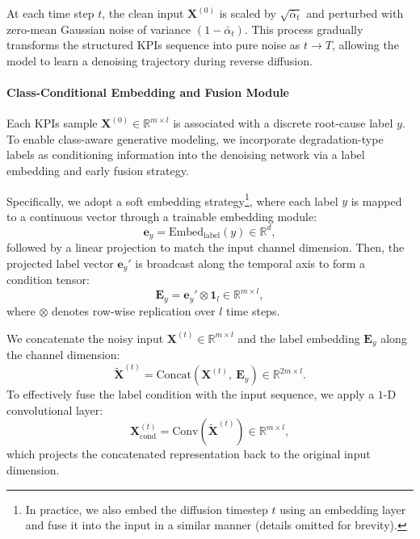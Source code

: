 \documentclass[lettersize,journal]{IEEEtran}
\begin{document}
At each time step $t$, the clean input $\mathbf{X}^{(0)}$ is scaled by $\sqrt{\bar{\alpha}_t}$ and perturbed with zero-mean Gaussian noise of variance $(1 - \bar{\alpha}_t)$. This process gradually transforms the structured KPIs sequence into pure noise as $t \rightarrow T$, allowing the model to learn a denoising trajectory during reverse diffusion.

\paragraph{Class-Conditional Embedding and Fusion Module}

Each KPIs sample $\mathbf{X}^{(0)} \in \mathbb{R}^{m \times l}$ is associated with a discrete root-cause label $y$. 
To enable class-aware generative modeling, we incorporate degradation-type labels as conditioning information into the denoising network via a label embedding and early fusion strategy. 

Specifically, we adopt a soft embedding strategy\footnote{In practice, we also embed the diffusion timestep $t$ using an embedding layer and fuse it into the input in a similar manner (details omitted for brevity).}, where each label $y$ is mapped to a continuous vector through a trainable embedding module:
\begin{equation}
\mathbf{e}_y = \mathrm{Embed}_{\text{label}}(y) \in \mathbb{R}^d,
\end{equation}
followed by a linear projection to match the input channel dimension. Then, the projected label vector $\mathbf{e}_y'$ is broadcast along the temporal axis to form a condition tensor:
\begin{equation}
\mathbf{E}_y = \mathbf{e}_y' \otimes \mathbf{1}_l \in \mathbb{R}^{m \times l},
\end{equation}
where $\otimes$ denotes row-wise replication over $l$ time steps.

We concatenate the noisy input $\mathbf{X}^{(t)} \in \mathbb{R}^{m \times l}$ and the label embedding $\mathbf{E}_y$ along the channel dimension:
\begin{equation}
\tilde{\mathbf{X}}^{(t)} = \mathrm{Concat}\left(\mathbf{X}^{(t)},\ \mathbf{E}_y\right) \in \mathbb{R}^{2m \times l}.
\end{equation}
To effectively fuse the label condition with the input sequence, we apply a $1$-D convolutional layer:
\begin{equation}
\mathbf{X}_{\text{cond}}^{(t)} = \mathrm{Conv}(\tilde{\mathbf{X}}^{(t)}) \in \mathbb{R}^{m \times l},
\end{equation}
which projects the concatenated representation back to the original input dimension. 
\end{document}

